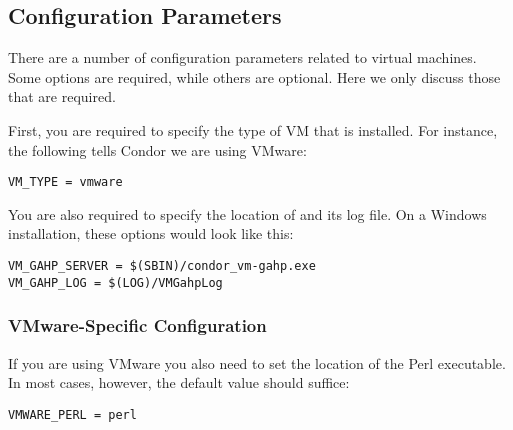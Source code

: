 \subsection{Configuration Parameters}

There are a number of configuration parameters related to virtual
machines. Some options are required, while others are 
optional.  Here we only discuss those that are required.

First, you are required to specify the type of VM that is installed. 
For instance, the following tells Condor we are using VMware:

\begin{verbatim}
VM_TYPE = vmware
\end{verbatim}

You are also required to specify the location of  and
its log file.
On a Windows installation, these options would look like this:

\begin{verbatim}
VM_GAHP_SERVER = $(SBIN)/condor_vm-gahp.exe
VM_GAHP_LOG = $(LOG)/VMGahpLog
\end{verbatim}





\subsubsection{VMware-Specific Configuration}

If you are using VMware you also need to set the location of the Perl 
executable.  In most cases, however, the default value should suffice:

\begin{verbatim}
VMWARE_PERL = perl
\end{verbatim}

